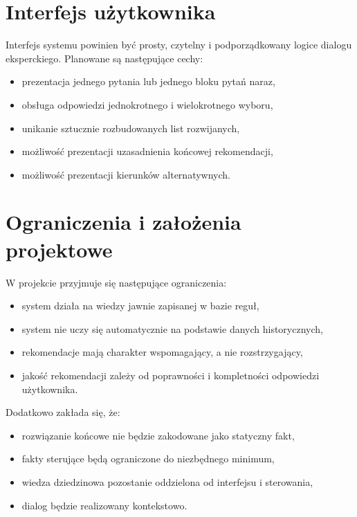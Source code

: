 \documentclass[12pt,a4paper,oneside]{article}
\begin{document}
\section{Interfejs użytkownika}

Interfejs systemu powinien być prosty, czytelny i podporządkowany logice dialogu eksperckiego. Planowane są następujące cechy:
\begin{itemize}[leftmargin=1.2cm]
    \item prezentacja jednego pytania lub jednego bloku pytań naraz,
    \item obsługa odpowiedzi jednokrotnego i wielokrotnego wyboru,
    \item unikanie sztucznie rozbudowanych list rozwijanych,
    \item możliwość prezentacji uzasadnienia końcowej rekomendacji,
    \item możliwość prezentacji kierunków alternatywnych.
\end{itemize}


\section{Ograniczenia i założenia projektowe}

W projekcie przyjmuje się następujące ograniczenia:
\begin{itemize}[leftmargin=1.2cm]
    \item system działa na wiedzy jawnie zapisanej w bazie reguł,
    \item system nie uczy się automatycznie na podstawie danych historycznych,
    \item rekomendacje mają charakter wspomagający, a nie rozstrzygający,
    \item jakość rekomendacji zależy od poprawności i kompletności odpowiedzi użytkownika.
\end{itemize}

Dodatkowo zakłada się, że:
\begin{itemize}[leftmargin=1.2cm]
    \item rozwiązanie końcowe nie będzie zakodowane jako statyczny fakt,
    \item fakty sterujące będą ograniczone do niezbędnego minimum,
    \item wiedza dziedzinowa pozostanie oddzielona od interfejsu i sterowania,
    \item dialog będzie realizowany kontekstowo.
\end{itemize}
\end{document}
